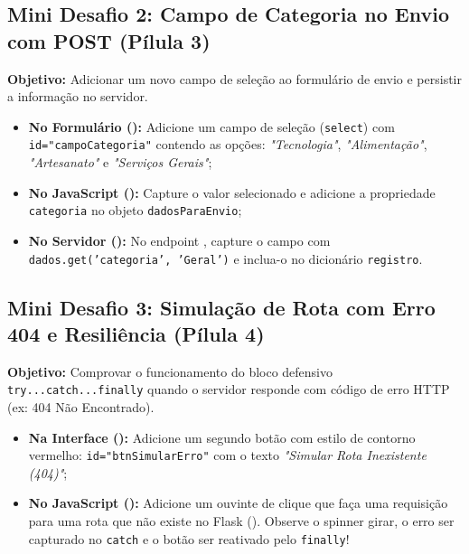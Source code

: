 \subsection*{\hspace{0.4em}Mini Desafio 2: Campo de Categoria no Envio com POST (Pílula 3)}
\textbf{Objetivo:} Adicionar um novo campo de seleção ao formulário de envio e persistir a informação no servidor.
\begin{itemize}
  \item \textbf{No Formulário ():} Adicione um campo de seleção (\texttt{select}) com \texttt{id="campoCategoria"} contendo as opções: \textit{"Tecnologia"}, \textit{"Alimentação"}, \textit{"Artesanato"} e \textit{"Serviços Gerais"};
  \item \textbf{No JavaScript ():} Capture o valor selecionado e adicione a propriedade \texttt{categoria} no objeto \texttt{dadosParaEnvio};
  \item \textbf{No Servidor ():} No endpoint , capture o campo com \texttt{dados.get('categoria', 'Geral')} e inclua-o no dicionário \texttt{registro}.
\end{itemize}

\subsection*{\hspace{0.4em}Mini Desafio 3: Simulação de Rota com Erro 404 e Resiliência (Pílula 4)}
\textbf{Objetivo:} Comprovar o funcionamento do bloco defensivo \texttt{try...catch...finally} quando o servidor responde com código de erro HTTP (ex: 404 Não Encontrado).
\begin{itemize}
  \item \textbf{Na Interface ():} Adicione um segundo botão com estilo de contorno vermelho: \texttt{id="btnSimularErro"} com o texto \textit{"Simular Rota Inexistente (404)"};
  \item \textbf{No JavaScript ():} Adicione um ouvinte de clique que faça uma requisição para uma rota que não existe no Flask (). Observe o spinner girar, o erro ser capturado no \texttt{catch} e o botão ser reativado pelo \texttt{finally}!
\end{itemize}

